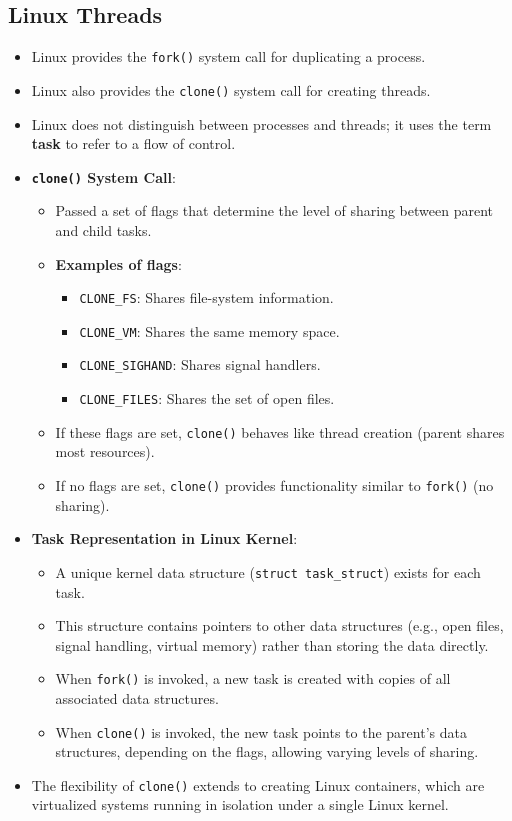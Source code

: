 \subsection{Linux Threads}
\begin{itemize}
    \item Linux provides the \texttt{fork()} system call for duplicating a process.
    \item Linux also provides the \texttt{clone()} system call for creating threads.
    \item Linux does not distinguish between processes and threads; it uses the term \textbf{task} to refer to a flow of control.
    \item \textbf{\texttt{clone()} System Call}:
        \begin{itemize}
            \item Passed a set of flags that determine the level of sharing between parent and child tasks.
            \item \textbf{Examples of flags}:
                \begin{itemize}
                    \item \texttt{CLONE\_FS}: Shares file-system information.
                    \item \texttt{CLONE\_VM}: Shares the same memory space.
                    \item \texttt{CLONE\_SIGHAND}: Shares signal handlers.
                    \item \texttt{CLONE\_FILES}: Shares the set of open files.
                \end{itemize}
            \item If these flags are set, \texttt{clone()} behaves like thread creation (parent shares most resources).
            \item If no flags are set, \texttt{clone()} provides functionality similar to \texttt{fork()} (no sharing).
        \end{itemize}
    \item \textbf{Task Representation in Linux Kernel}:
        \begin{itemize}
            \item A unique kernel data structure (\texttt{struct task\_struct}) exists for each task.
            \item This structure contains pointers to other data structures (e.g., open files, signal handling, virtual memory) rather than storing the data directly.
            \item When \texttt{fork()} is invoked, a new task is created with copies of all associated data structures.
            \item When \texttt{clone()} is invoked, the new task points to the parent's data structures, depending on the flags, allowing varying levels of sharing.
        \end{itemize}
    \item The flexibility of \texttt{clone()} extends to creating Linux containers, which are virtualized systems running in isolation under a single Linux kernel.
\end{itemize}

